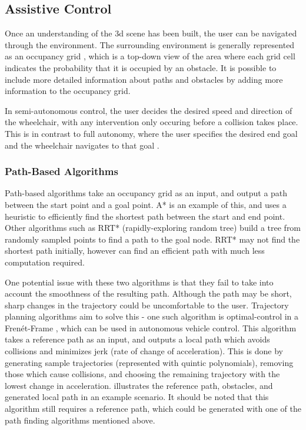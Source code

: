 \documentclass[12pt]{article}
\begin{document}

\pagebreak
\subsection{Assistive Control}
Once an understanding of the 3d scene has been built, the user can be navigated through the environment.
The surrounding environment is generally represented as an occupancy grid \cite{elfesUsingOccupancyGrids1989},
which is a top-down view of the area where each grid cell indicates the probability that it is occupied
by an obstacle. It is possible to include more detailed information about
paths and obstacles by adding more information to the occupancy grid.

In semi-autonomous control, the user decides the desired speed and direction of the wheelchair, with any intervention only
occuring before a collision takes place. This is in contrast to full autonomy, where the user specifies the
desired end goal and the wheelchair navigates to that goal \cite{wangS2P2SelfSupervisedGoalDirected2021}.

\subsubsection{Path-Based Algorithms}
Path-based algorithms take an occupancy grid as an input, and output a path between the start point and a goal point.
A* is an example of this, and uses a heuristic to efficiently find the shortest path between the start and end point.
Other algorithms such as RRT* (rapidly-exploring random tree) \cite{karamanSamplingbasedAlgorithmsOptimal2011} build a tree from randomly sampled points
to find a path to the goal node. RRT* may not find the shortest path initially, however can find an efficient path with much less
computation required.

One potential issue with these two algorithms is that they fail to take into account the smoothness of the resulting path.
Although the path may be short, sharp changes in the trajectory could be uncomfortable to the user.
Trajectory planning algorithms aim to solve this - one such algorithm is optimal-control in a Fren\'et-Frame \cite{werlingOptimalTrajectoryGeneration2010},
which can be used in autonomous vehicle control.
This algorithm takes a reference path as an input, and outputs a local path which avoids collisions and minimizes jerk (rate of change of acceleration).
This is done by generating sample trajectories (represented with quintic polynomials), removing those which cause collisions, and choosing
the remaining trajectory with the lowest change in acceleration.  illustrates the reference path, obstacles, and generated
local path in an example scenario.
It should be noted that this algorithm still requires a reference path, which could be generated
with one of the path finding algorithms mentioned above.
\end{document}
